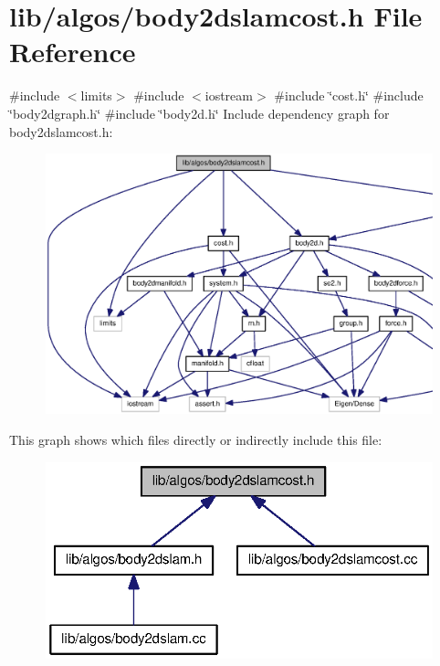 \section{lib/algos/body2dslamcost.h \-File \-Reference}
\label{body2dslamcost_8h}
{\ttfamily \#include $<$limits$>$}\*
{\ttfamily \#include $<$iostream$>$}\*
{\ttfamily \#include \char`\"{}cost.\-h\char`\"{}}\*
{\ttfamily \#include \char`\"{}body2dgraph.\-h\char`\"{}}\*
{\ttfamily \#include \char`\"{}body2d.\-h\char`\"{}}\*
\-Include dependency graph for body2dslamcost.\-h\-:
\nopagebreak
\begin{figure}[H]
\begin{center}
\leavevmode
\includegraphics[width=350pt]{body2dslamcost_8h__incl}
\end{center}
\end{figure}
\-This graph shows which files directly or indirectly include this file\-:
\nopagebreak
\begin{figure}[H]
\begin{center}
\leavevmode
\includegraphics[width=321pt]{body2dslamcost_8h__dep__incl}
\end{center}
\end{figure}
